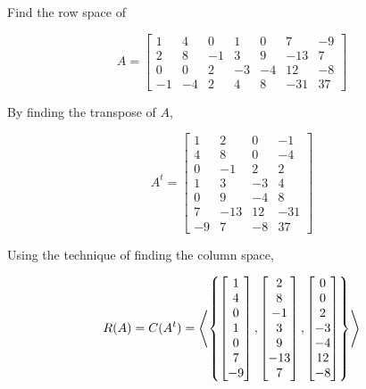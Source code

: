 \documentclass[a4paper,12pt]{article}
\begin{document}
\begin{exm}
  Find the row space of

  $$A=\begin{bmatrix}
    1 & 4 & 0 & 1 & 0 & 7 & -9\\
    2 & 8 & -1 & 3 & 9 & -13 & 7\\
    0 & 0 & 2 & -3 & -4 & 12 & -8\\
    -1 & -4 & 2 & 4 & 8 & -31 & 37
  \end{bmatrix}$$\s

  \ans By finding the transpose of $A$,

  $$A^{t}=\begin{bmatrix}
    1 & 2 & 0 & -1\\
    4 & 8 & 0 & -4\\
    0 & -1 & 2 & 2\\
    1 & 3 & -3 & 4\\
    0 & 9 & -4 & 8\\
    7 & -13 & 12 & -31\\
    -9 & 7 & -8 & 37
  \end{bmatrix}$$\s

  Using the technique of finding the column space,

  $$R(A)=C(A^{t})=\left\langle \left\{ \begin{bmatrix}
    1\\
    4\\
    0\\
    1\\
    0\\
    7\\
    -9
  \end{bmatrix},\begin{bmatrix}
    2\\
    8\\
    -1\\
    3\\
    9\\
    -13\\
    7
  \end{bmatrix},\begin{bmatrix}
    0\\
    0\\
    2\\
    -3\\
    -4\\
    12\\
    -8
  \end{bmatrix}\right\}\right\rangle$$
\end{exm}\n
\end{document}
